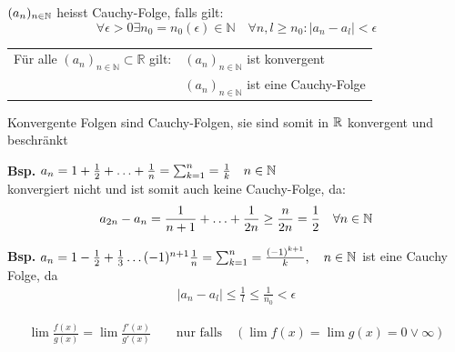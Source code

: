 \documentclass[a4paper]{article}
\begin{document}
	\begin{fdef}
			$(a_n)_{n\in \mathbb{N}}$ heisst Cauchy-Folge, falls gilt:\\
			$$\forall \epsilon > 0 \exists n_0 = n_0(\epsilon) \in \mathbb{N} \quad \forall n, l \geq n_0: \vert a_n - a_{l} \vert < \epsilon$$
			\begin{tabular}{l l}
				Für alle $(a_n)_{n \in \mathbb{N}} \subset \mathbb{R}$ gilt: & $(a_n)_{n \in \mathbb{N}}$ ist konvergent\\
				&  $(a_n)_{n \in \mathbb{N}}$ ist eine Cauchy-Folge	 
			\end{tabular}
	\end{fdef}
	\vspace{-5mm}
	\begin{fsatz}
	\vspace{-3mm}
		Konvergente Folgen sind Cauchy-Folgen, sie sind somit in $\mathbb{R}$
		konvergent und beschränkt
	\end{fsatz}
	\vspace{-7mm}
	\begin{multicols}{2}
		\begin{fmerke}
			\textbf{Bsp.} $a_n= 1 + \frac{1}{2} + \ldots + \frac{1}{n} = \sum_{k=1}^n =
			\frac{1}{k} \quad n \in \mathbb{N}$\\
			konvergiert nicht und ist somit auch keine Cauchy-Folge, da:
			\vspace{-5mm}
			 \begin{align*}
			 	a_{2n} - a_n = \frac{1}{n+1} + \ldots + \frac{1}{2n} \geq \frac{n}{2n} = \frac{1}{2} \quad \forall n \in \mathbb{N}
			 \end{align*}
		\end{fmerke}
	
		\begin{fmerke}
			\textbf{Bsp.} $a_n= 1 - \frac{1}{2} + \frac{1}{3} \ldots (-1)^{n+1} \frac{1}{n} = \sum_{k=1}^{n}= \frac{(-1)^{k+1}}{k}, \quad n \in
			\mathbb{N}$ ist eine Cauchy Folge, da
			\vspace{-3mm}
			\begin{align*}
				|a_n- a_l| \leq \frac{1}{l} \leq \frac{1}{n_0} < \epsilon
			\end{align*}
			\vspace{-3mm}
		\end{fmerke}
	\end{multicols}
	
	
	\begin{fsatz}
		\vspace{-3mm}
		\begin{align*}
			\lim \frac{f(x)}{g(x)} = \lim \frac{f'(x)}{g'(x)}	\qquad \mbox{nur falls} \quad (\lim f(x) = \lim g(x) = 0 \vee \infty)
		\end{align*}
		\vspace{-3mm}
	\end{fsatz}
	
\end{document}
